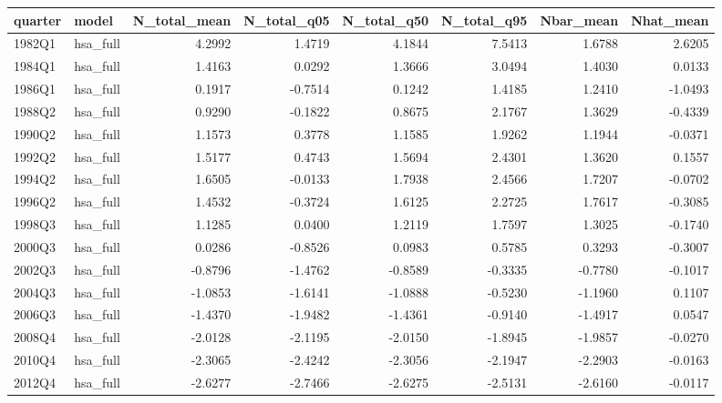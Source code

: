\begin{tabular}{llrrrrrr}
\toprule
quarter & model & N\_total\_mean & N\_total\_q05 & N\_total\_q50 & N\_total\_q95 & Nbar\_mean & Nhat\_mean \\
\midrule
1982Q1 & hsa\_full & 4.2992 & 1.4719 & 4.1844 & 7.5413 & 1.6788 & 2.6205 \\
1984Q1 & hsa\_full & 1.4163 & 0.0292 & 1.3666 & 3.0494 & 1.4030 & 0.0133 \\
1986Q1 & hsa\_full & 0.1917 & -0.7514 & 0.1242 & 1.4185 & 1.2410 & -1.0493 \\
1988Q2 & hsa\_full & 0.9290 & -0.1822 & 0.8675 & 2.1767 & 1.3629 & -0.4339 \\
1990Q2 & hsa\_full & 1.1573 & 0.3778 & 1.1585 & 1.9262 & 1.1944 & -0.0371 \\
1992Q2 & hsa\_full & 1.5177 & 0.4743 & 1.5694 & 2.4301 & 1.3620 & 0.1557 \\
1994Q2 & hsa\_full & 1.6505 & -0.0133 & 1.7938 & 2.4566 & 1.7207 & -0.0702 \\
1996Q2 & hsa\_full & 1.4532 & -0.3724 & 1.6125 & 2.2725 & 1.7617 & -0.3085 \\
1998Q3 & hsa\_full & 1.1285 & 0.0400 & 1.2119 & 1.7597 & 1.3025 & -0.1740 \\
2000Q3 & hsa\_full & 0.0286 & -0.8526 & 0.0983 & 0.5785 & 0.3293 & -0.3007 \\
2002Q3 & hsa\_full & -0.8796 & -1.4762 & -0.8589 & -0.3335 & -0.7780 & -0.1017 \\
2004Q3 & hsa\_full & -1.0853 & -1.6141 & -1.0888 & -0.5230 & -1.1960 & 0.1107 \\
2006Q3 & hsa\_full & -1.4370 & -1.9482 & -1.4361 & -0.9140 & -1.4917 & 0.0547 \\
2008Q4 & hsa\_full & -2.0128 & -2.1195 & -2.0150 & -1.8945 & -1.9857 & -0.0270 \\
2010Q4 & hsa\_full & -2.3065 & -2.4242 & -2.3056 & -2.1947 & -2.2903 & -0.0163 \\
2012Q4 & hsa\_full & -2.6277 & -2.7466 & -2.6275 & -2.5131 & -2.6160 & -0.0117 \\
\bottomrule
\end{tabular}
